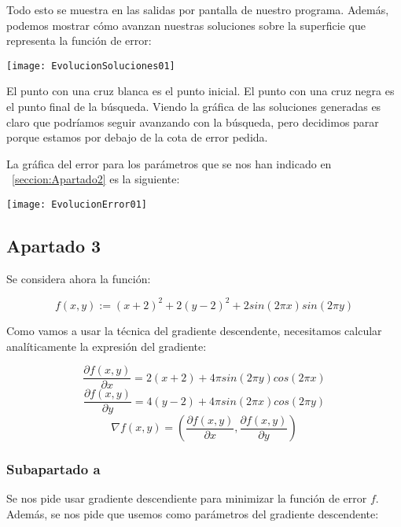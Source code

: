 \documentclass[11pt]{article}
\begin{document}
Todo esto se muestra en las salidas por pantalla de nuestro programa. Además, podemos mostrar cómo avanzan nuestras soluciones sobre la superficie que representa la función de error:

\texttt{[image: EvolucionSoluciones01]}

El punto con una cruz blanca es el punto inicial. El punto con una cruz negra es el punto final de la búsqueda. Viendo la gráfica de las soluciones generadas es claro que podríamos seguir avanzando con la búsqueda, pero decidimos parar porque estamos por debajo de la cota de error pedida.

La gráfica del error para los parámetros que se nos han indicado en ~\ref{seccion:Apartado2} es la siguiente:

\texttt{[image: EvolucionError01]}

\pagebreak

\subsection{Apartado 3}

Se considera ahora la función:

\begin{displaymath}
    f(x,y) := (x+2)^2 + 2(y-2)^2 + 2 sin(2\pi x) sin(2 \pi y)
\end{displaymath}

Como vamos a usar la técnica del gradiente descendente, necesitamos calcular analíticamente la expresión del gradiente:

\begin{displaymath}
    \frac{\partial f(x,y)}{\partial x} = 2(x+2) + 4 \pi sin(2 \pi y) cos(2 \pi x)
\end{displaymath}
\begin{displaymath}
    \frac{\partial f(x,y)}{\partial y} = 4(y - 2) + 4 \pi sin(2 \pi x) cos(2 \pi y)
\end{displaymath}
\begin{displaymath}
    \nabla f(x, y) = (\frac{\partial f(x,y)}{\partial x}, \frac{\partial f(x,y)}{\partial y})
\end{displaymath}

\subsubsection{Subapartado a}

Se nos pide usar gradiente descendiente para minimizar la función de error $f$. Además, se nos pide que usemos como parámetros del gradiente descendente:
\end{document}
